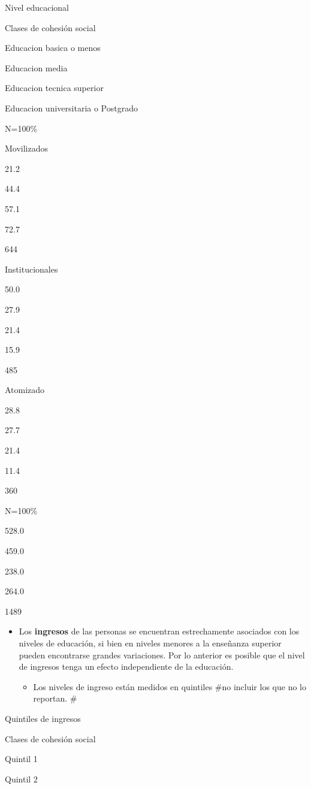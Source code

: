 \documentclass[
  12pt,
]{book}
\providecommand{\tightlist}{%
  \setlength{\itemsep}{0pt}\setlength{\parskip}{0pt}}
\begin{document}
Nivel educacional

Clases de cohesión social

Educacion basica o menos

Educacion media

Educacion tecnica superior

Educacion universitaria o Postgrado

N=100\%

Movilizados

21.2

44.4

57.1

72.7

644

Institucionales

50.0

27.9

21.4

15.9

485

Atomizado

28.8

27.7

21.4

11.4

360

N=100\%

528.0

459.0

238.0

264.0

1489

\begin{itemize}
\tightlist
\item
  Los \textbf{ingresos} de las personas se encuentran estrechamente asociados con los niveles de educación, si bien en niveles menores a la enseñanza superior pueden encontrarse grandes variaciones. Por lo anterior es posible que el nivel de ingresos tenga un efecto independiente de la educación.

  \begin{itemize}
  \tightlist
  \item
    Los niveles de ingreso están medidos en quintiles \#no incluir los que no lo reportan. \#
  \end{itemize}
\end{itemize}

Quintiles de ingresos

Clases de cohesión social

Quintil 1

Quintil 2
\end{document}
